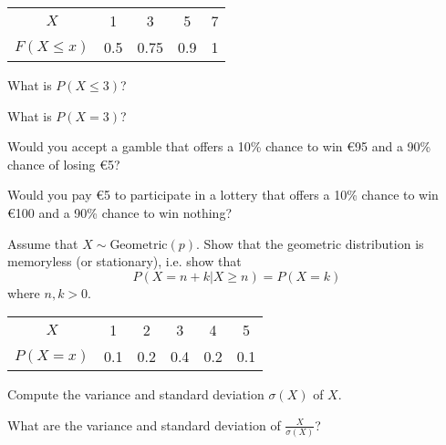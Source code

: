\documentclass[10pt, a5paper]{scrartcl}
\begin{document}
\boardquestions

\begin{exercise}
	\begin{tabular}{c c c c c }
	\toprule
	$X$ 			& 1		& 3		& 5		& 7 \\
	$F(X \leq x)$	& 0.5	& 0.75	& 0.9	& 1 \\
	\bottomrule
	\end{tabular}

	\begin{subex}
		What is $ P(X \leq 3) $?	
	\end{subex}

	\begin{subex}
	What is $ P(X = 3) $?	
	\end{subex}
\end{exercise}


\begin{exercise}[Expectations]
	\begin{subex}
		Would you accept a gamble that offers a 10\% chance to win \euro95 and a 90\% chance of losing \euro5?
	\end{subex}
	
	\begin{subex}
		Would you pay \euro5 to participate in a lottery that offers a 10\% chance to win \euro100 and a 90\% chance to win nothing?
	\end{subex}
\end{exercise}


\begin{exercise}[Memorylessness]
	Assume that $ X \sim \text{Geometric}(p) $. Show that the geometric distribution is memoryless (or stationary), i.e. show that 
	\[
		P(X = n + k | X \geq n) = P(X = k)
	\]
	where $ n,k > 0 $.
\end{exercise}


\begin{exercise}[Variance]
	\begin{tabular}{c c c c c c}
	\toprule
	$ X $		& 1		&2		& 3		& 4		& 5	\\
	$P(X = x)$	& 0.1 	& 0.2	& 0.4	& 0.2	& 0.1 \\
	\bottomrule
	\end{tabular}

	\begin{subex}
		Compute the variance and standard deviation $ \sigma(X) $ of $ X $.
	\end{subex}
	
	\begin{subex}
		What are the variance and standard deviation of $ \frac{X}{\sigma(X)}$?
	\end{subex}
\end{exercise}


\vfill
{}
\end{document}

